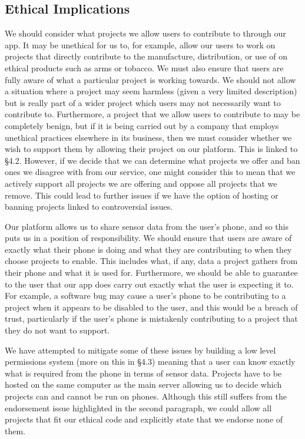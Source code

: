\documentclass{article}
\begin{document}
\subsection{Ethical Implications}
We should consider what projects we allow users to contribute to through our app. It may be unethical for us to, for example, allow our
users to work on projects that directly contribute to the manufacture, distribution, or use of on ethical products such as arms or tobacco.
We must also ensure that users are fully aware of what a particular project is working towards. We should not allow a situation where a project
may seem harmless (given a very limited description) but is really part of a wider project which users may not necessarily want to contribute to.
Furthermore, a project that we allow users to contribute to may be completely benign, but if it is being carried out by a company that employs
unethical practices elsewhere in its business, then we must consider whether we wish to support them by allowing their project on our platform.
This is linked to §4.2.
However, if we decide that we can determine what projects we offer and ban ones we disagree with from our service, one might consider this to mean
that we actively support all projects we are offering and oppose all projects that we remove. This could lead to further issues if we have the
option of hosting or banning projects linked to controversial issues.

Our platform allows us to share sensor data from the user’s phone, and so this puts us in a position of responsibility. We should ensure that
users are aware of exactly what their phone is doing and what they are contributing to when they choose projects to enable. This includes what,
if any, data a project gathers from their phone and what it is used for. Furthermore, we should be able to guarantee to the user that our app
does carry out exactly what the user is expecting it to. For example, a software bug may cause a user’s phone to be contributing to a project
when it appears to be disabled to the user, and this would be a breach of trust, particularly if the user’s phone is mistakenly contributing
to a project that they do not want to support.

We have attempted to mitigate some of these issues by building a low level permissions system (more on this in §4.3) meaning that a user can
know exactly what is required from the phone in terms of sensor data. Projects have to be hosted on the same computer as the main server
allowing us to decide which projects can and cannot be run on phones. Although this still suffers from the endorsement issue highlighted in
the second paragraph, we could allow all projects that fit our ethical code and explicitly state that we endorse none of them.
\end{document}
